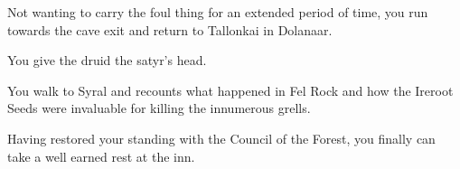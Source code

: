 Not wanting to carry the foul thing for an extended period of time, you run towards the cave exit and return to Tallonkai in Dolanaar.


You give the druid the satyr's head.  %


You walk to Syral and recounts what happened in Fel Rock and how the Ireroot Seeds were invaluable for killing the innumerous grells.


Having restored your standing with the Council of the Forest, you finally can take a well earned rest at the inn.
